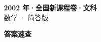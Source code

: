 \documentclass[zihao=-4, a4paper]{ctexart}
\begin{document}
\begin{center}
  {\Large\bfseries 2002 年·全国新课程卷·文科}\\[4pt]
  {\large 数学 · 简答版}
\end{center}
\medskip
{}

\clearpage
{}
\begin{center}{\Large\bfseries 答案速查}\end{center}
\medskip

\end{document}

